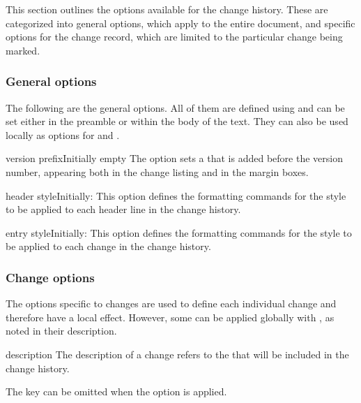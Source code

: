 \documentclass[11pt]{article}
\begin{document}
This section outlines the options available for the change history. These are categorized into general options, which apply to the entire document, and specific options for the change record, which are limited to the particular change being marked.

\subsubsection{General options}

The following are the general options. All of them are defined using  and can be set either in the preamble or within the body of the text. They can also be used locally as options for  and .

\begin{Optiondef}{version prefix}{}{Initially empty}
    The  option sets a  that is added before the version number, appearing both in the change listing and in the margin boxes.
\end{Optiondef}

\begin{Optiondef}{header style}{}{Initially: }
    This option defines the formatting commands for the style to be applied to each header line in the change history.
\end{Optiondef}

\begin{Optiondef}{entry style}{}{Initially: }
    This option defines the formatting commands for the style to be applied to each change in the change history.
\end{Optiondef}

\subsubsection{Change options}\label{sec:change-options}

The options specific to changes are used to define each individual change and therefore have a local effect. However, some can be applied globally with , as noted in their description.

\begin{Optiondef}{description}{}{}
    The description of a change refers to the  that will be included in the change history.

    The  key can be omitted when the  option is applied.
\end{Optiondef}
\end{document}
